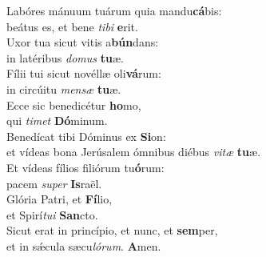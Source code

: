 \evenverse Labóres mánuum tuárum quia mandu\textbf{cá}bis:~\*\\
\evenverse beátus es, et bene \textit{ti}\textit{bi} \textbf{e}rit.\\
\oddverse Uxor tua sicut vitis a\textbf{bún}dans:~\*\\
\oddverse in latéribus \textit{do}\textit{mus} \textbf{tu}æ.\\
\evenverse Fílii tui sicut novéllæ oli\textbf{vá}rum:~\*\\
\evenverse in circúitu \textit{men}\textit{sæ} \textbf{tu}æ.\\
\oddverse Ecce sic benedicétur \textbf{ho}mo,~\*\\
\oddverse qui \textit{ti}\textit{met} \textbf{Dó}minum.\\
\evenverse Benedícat tibi Dóminus ex \textbf{Si}on:~\*\\
\evenverse et vídeas bona Jerúsalem ómnibus diébus \textit{vi}\textit{tæ} \textbf{tu}æ.\\
\oddverse Et vídeas fílios filiórum tu\textbf{ó}rum:~\*\\
\oddverse pacem \textit{su}\textit{per} \textbf{Is}raël.\\
\evenverse Glória Patri, et \textbf{Fí}lio,~\*\\
\evenverse et Spirí\textit{tu}\textit{i} \textbf{San}cto.\\
\oddverse Sicut erat in princípio, et nunc, et \textbf{sem}per,~\*\\
\oddverse et in sǽcula sæcu\textit{ló}\textit{rum}. \textbf{A}men.\\
